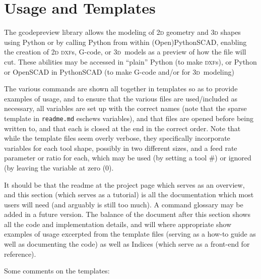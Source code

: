 \documentclass{ltxdoc}
\begin{document}

\clearpage

\section{Usage and Templates}

The gcodepreview library allows the modeling of \textsc{2d} geometry and \textsc{3d} shapes using Python or by calling Python from within (Open)PythonSCAD, enabling the creation of \textsc{2d} \textsc{dxf}s, G-code, or \textsc{3d}~models as a preview of how the file will cut. These abilities may be accessed in ``plain'' Python (to make \textsc{dxf}s), or Python or OpenSCAD in PythonSCAD (to make G-code and/or for \textsc{3d}~modeling)

The various commands are shown all together in templates so as to provide examples of usage, and to ensure that the various files are used/included as necessary, all variables are set up with the correct names (note that the sparse template in \verb|readme.md| eschews variables), and that files are opened before being written to, and that each is closed at the end in the correct order. Note that while the template files seem overly verbose, they specifically incorporate variables for each tool shape, possibly in two different sizes, and a feed rate parameter or ratio for each, which may be used (by setting a tool \#) or ignored (by leaving the variable at zero (0). 

It should be that the readme at the project page which serves as an overview, and this section (which serves as a tutorial) is all the documentation which most users will need (and arguably is still too much). A command glossary may be added in a future version. The balance of the document after this section shows all the code and implementation details, and will where appropriate show examples of usage excerpted from the template files  (serving as a how-to guide as well as documenting the code) as well as Indices (which serve as a front-end for reference).


Some comments on the templates:
\end{document}
